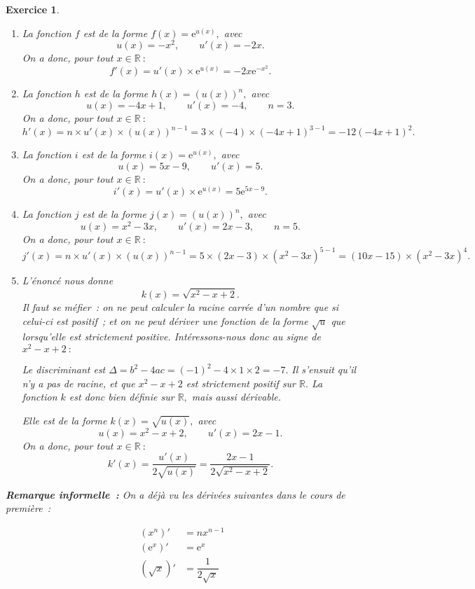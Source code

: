 \documentclass[10pt]{article}
\newtheorem{exo}{Exercice}
\begin{document}
\begin{exo}


\begin{enumerate}
\item La fonction $f$ est de la forme $f(x)=\text{e}^{u(x)},$ avec \[u(x)=-x^2,\qquad u'(x)=-2x.\]
 On a donc, pour tout $x\in\mathbb{R}~:$ \[f'(x)=u'(x)\times\text{e}^{u(x)}=-2x\text{e}^{-x^2}.\]
\item La fonction $h$ est de la forme $h(x)=\left(u(x)\right)^n,$ avec \[u(x)=-4x+1,\qquad u'(x)=-4,\qquad n=3.\]
 On a donc, pour tout $x\in\mathbb{R}~:$ \[h'(x)=n\times u'(x)\times \left(u(x)\right)^{n-1}=3\times (-4)\times (-4x+1)^{3-1}=-12\left(-4x+1\right)^2.\]
\item La fonction $i$ est de la forme $i(x)=\text{e}^{u(x)},$ avec \[u(x)=5x-9,\qquad u'(x)=5.\]
 On a donc, pour tout $x\in\mathbb{R}~:$ \[i'(x)=u'(x)\times\text{e}^{u(x)}=5\text{e}^{5x-9}.\]
\item La fonction $j$ est de la forme $j(x)=\left(u(x)\right)^n,$ avec \[u(x)=x^2-3x,\qquad u'(x)=2x-3,\qquad n=5.\]
 On a donc, pour tout $x\in\mathbb{R}~:$ \[j'(x)=n\times u'(x)\times \left(u(x)\right)^{n-1}=5\times \left(2x-3\right)\times \left(x^2-3x\right)^{5-1}=\left(10x-15\right)\times \left(x^2-3x\right)^4.\]
\item L'énoncé nous donne \[k(x)=\sqrt{x^2-x+2}.\] Il faut se méfier~: on ne peut calculer la racine carrée d'un nombre que si celui-ci est positif~; et on ne peut dériver une fonction de la forme $\sqrt{u}$ que lorsqu'elle est strictement positive. Intéressons-nous donc au signe de $x^2-x+2~:$

\medskip

Le discriminant est $\Delta=b^2-4ac=(-1)^2-4\times 1\times 2=-7.$ Il s'ensuit qu'il n'y a pas de racine, et que  $x^2-x+2$ est strictement positif sur $\mathbb{R}.$ La fonction $k$ est donc bien définie sur $\mathbb{R},$ mais aussi dérivable.

\medskip

Elle est de la forme $k(x)=\sqrt{u(x)},$ avec  \[u(x)=x^2-x+2,\qquad u'(x)=2x-1.\]
 On a donc, pour tout $x\in\mathbb{R}~:$ \[k'(x)=\dfrac{u'(x)}{2\sqrt{u(x)}}=\dfrac{2x-1}{2\sqrt{x^2-x+2}}.\]
\end{enumerate}


\medskip

\textbf{Remarque informelle~:} On a déjà vu les dérivées suivantes dans le cours de première~:

\begin{align*}
\left(x^n\right)'&=nx^{n-1}\\
\left(\text{e}^x\right)'&=\text{e}^x\\
\left(\sqrt{x}\right)'&=\dfrac{1}{2\sqrt{x}}
\end{align*}


\end{exo}
\end{document}

